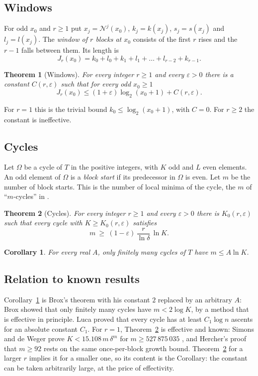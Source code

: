 \documentclass[11pt]{amsart}
\newtheorem{theorem}{Theorem}
\newtheorem{corollary}{Corollary}
\theoremstyle{remark}
\newcommand{\N}{\mathcal{N}}
\newcommand{\Om}{\Omega}
\begin{document}
\subsection*{Windows}
For odd $x_0$ and $r\ge 1$ put $x_j=\N^j(x_0)$, $k_j=k(x_j)$, $s_j=s(x_j)$ and $l_j=l(x_j)$.
The \emph{window of $r$ blocks at $x_0$} consists of the first $r$ rises and the $r-1$ falls
between them. Its length is
\[
J_r(x_0)=k_0+l_0+k_1+l_1+\dots+l_{r-2}+k_{r-1}.
\]

\begin{theorem}[Windows]\label{thm:window}
For every integer $r\ge 1$ and every $\varepsilon>0$ there is a constant $C(r,\varepsilon)$
such that for every odd $x_0\ge 1$
\[
J_r(x_0)\le (1+\varepsilon)\log_2(x_0+1)+C(r,\varepsilon).
\]
\end{theorem}

For $r=1$ this is the trivial bound $k_0\le\log_2(x_0+1)$, with $C=0$. For $r\ge 2$ the
constant is ineffective.

\subsection*{Cycles}
Let $\Om$ be a cycle of $T$ in the positive integers, with $K$ odd and $L$ even elements. An
odd element of $\Om$ is a \emph{block start} if its predecessor in $\Om$ is even. Let $m$ be
the number of block starts. This is the number of local minima of the cycle, the $m$ of
``$m$-cycles'' in \cite{SdW}.

\begin{theorem}[Cycles]\label{thm:cycles}
For every integer $r\ge 1$ and every $\varepsilon>0$ there is $K_0(r,\varepsilon)$ such that
every cycle with $K\ge K_0(r,\varepsilon)$ satisfies
\[
m\ \ge\ (1-\varepsilon)\,\frac{r}{\ln\delta}\,\ln K .
\]
\end{theorem}

\begin{corollary}\label{cor:main}
For every real $A$, only finitely many cycles of $T$ have $m\le A\ln K$.
\end{corollary}

\subsection*{Relation to known results}
Corollary~\ref{cor:main} is Brox's theorem with his constant $2$ replaced by an arbitrary
$A$: Brox \cite{Brox} showed that only finitely many cycles have $m<2\log K$, by a method
that is effective in principle. Luca \cite{Luca} proved that every cycle has at least
$C_1\log n$ ascents for an absolute constant $C_1$. For $r=1$, Theorem~\ref{thm:cycles} is
effective and known: Simons and de Weger prove $K<15.108\,m\,\delta^m$ for
$m\ge 527\,875\,035$ \cite[Theorem~3(d) of the 2010 version]{SdW}, and Hercher's proof that
$m\ge 92$ \cite{Hercher} rests on the same once-per-block growth bound.
Theorem~\ref{thm:cycles} for a larger $r$ implies it for a smaller one, so its content is the
Corollary: the constant can be taken arbitrarily large, at the price of effectivity.
\end{document}
